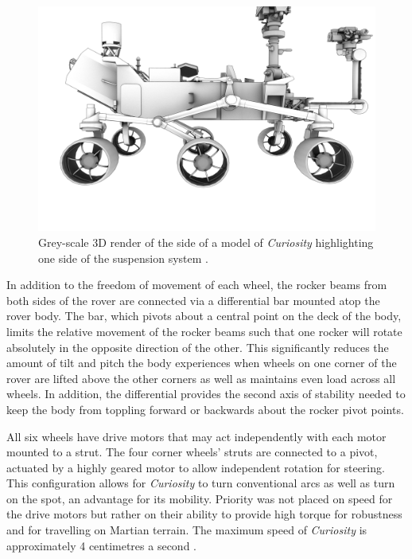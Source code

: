         \begin{figure}[h!]
          \centering
          \includegraphics[width=0.6\linewidth]{figures/litReview-suspensionStructure}
          \caption[Grey-scale 3D render of the side of a model of \textit{Curiosity} highlighting one side of the suspension system.]{Grey-scale 3D render of the side of a model of \textit{Curiosity} highlighting one side of the suspension system \cite{nasa3D}.}
          \label{fig:litReview-suspensionStructure}
        \end{figure}
        
        In addition to the freedom of movement of each wheel, the rocker beams from both sides of the rover are connected via a differential bar mounted atop the rover body. The bar, which pivots about a central point on the deck of the body, limits the relative movement of the rocker beams such that one rocker will rotate absolutely in the opposite direction of the other. This significantly reduces the amount of tilt and pitch the body experiences when wheels on one corner of the rover are lifted above the other corners as well as maintains even load across all wheels. In addition, the differential provides the second axis of stability needed to keep the body from toppling forward or backwards about the rocker pivot points.
        
        All six wheels have drive motors that may act independently with each motor mounted to a strut. The four corner wheels' struts are connected to a pivot, actuated by a highly geared motor to allow independent rotation for steering. This configuration allows for \textit{Curiosity} to turn conventional arcs as well as turn on the spot, an advantage for its mobility. Priority was not placed on speed for the drive motors but rather on their ability to provide high torque for robustness and for travelling on Martian terrain. The maximum speed of \textit{Curiosity} is approximately 4 centimetres a second \cite{msllegsandwheels}.
        
